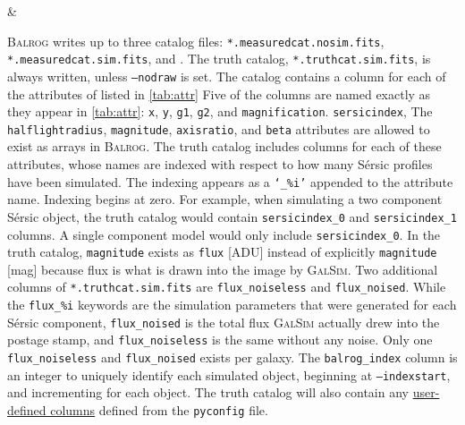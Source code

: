 \documentclass[11pt]{book}
\newcommand{\codett}[1]{\texttt{#1}}
\newcommand{\galsim}{\textsc{GalSim}}
\newcommand{\balrog}{\textsc{Balrog}}
\newcommand{\opt}[1]{\codett{--#1}}
\newcommand{\sersic}{S\'{e}rsic}
\begin{document}
\begin{table}
\begin{longtabu}
 & \\
\bottomrule %
\end{longtabu}
\end{table}

\balrog{} writes up to three catalog files:
\codett{*.measuredcat.nosim.fits}, \codett{*.measuredcat.sim.fits}, and .
The truth catalog, \codett{*.truthcat.sim.fits}, is always written, unless \codett{--nodraw} is set.
The catalog contains a column for each of the attributes of listed in \autoref{tab:attr}
Five of the columns are named exactly as they appear in \autoref{tab:attr}: 
\codett{x}, \codett{y}, \codett{g1}, \codett{g2}, and \codett{magnification}.
\codett{sersicindex}, 
The \codett{halflightradius}, \codett{magnitude}, \codett{axisratio}, and \codett{beta}
attributes are allowed to exist as arrays in \balrog{}. 
The truth catalog includes columns for each of these attributes, whose names
are indexed with respect to how many \sersic{} profiles have been simulated.
The indexing appears as a \codett{`\_\%i'} appended to the attribute name.
Indexing begins at zero.
For example, when simulating a two component \sersic{} object, the truth catalog
would contain \codett{sersicindex\_0} and \codett{sersicindex\_1} columns.
A single component model would only include \codett{sersicindex\_0}.
In the truth catalog, \codett{magnitude} exists as \codett{flux} [ADU] instead
of explicitly \codett{magnitude} [mag] because flux is what is drawn into the image by \galsim{}.
Two additional columns of \codett{*.truthcat.sim.fits} are \codett{flux\_noiseless} and \codett{flux\_noised}.
While the \codett{flux\_\%i} keywords are the simulation parameters that were generated for each \sersic{} component,
\codett{flux\_noised} is the total flux \galsim{} actually drew into the postage stamp,
and \codett{flux\_noiseless} is the same without any noise.
Only one \codett{flux\_noiseless} and \codett{flux\_noised} exists per galaxy.
The \codett{balrog\_index} column is an integer to uniquely identify each simulated object, beginning at \opt{indexstart},
and incrementing for each object.
The truth catalog will also contain any \hyperlink{hyper:addtruth}{user-defined columns} defined from the \codett{pyconfig} file.
\end{document}
